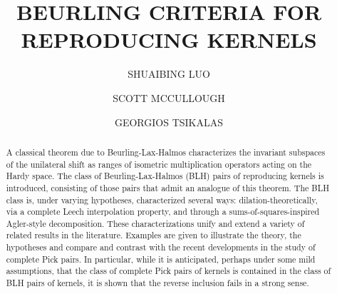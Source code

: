 \documentclass[a4paper,reqno,index]{amsart}
\numberwithin{equation}{section}
\theoremstyle{definition}
\begin{document}
\newcommand{\N}{\mathbb{N}}
\newcommand{\T}{\mathbb{T}}



\theoremstyle{definition}


\theoremstyle{remark}

\title[\small BEURLING CRITERIA FOR REPRODUCING KERNELS]{\large   BEURLING CRITERIA FOR REPRODUCING KERNELS}


\author[\small LUO]{SHUAIBING LUO}
\address{SCHOOL OF MATHEMATICS, HUNAN UNIVERSITY, CHANGSHA, HUNAN, 410082,
PR CHINA}


\author[\small MCCULLOUGH]{SCOTT MCCULLOUGH}
\address{DEPARTMENT OF MATHEMATICS, UNIVERSITY OF FLORIDA, GAINESVILLE, FL}
\author[\small TSIKALAS]{GEORGIOS TSIKALAS}
\address{DEPARTMENT OF MATHEMATICS, UC SANTA BARBARA, SANTA BARBARA, CA}






 

\small
\begin{abstract}
 A classical theorem due to Beurling-Lax-Halmos characterizes the invariant subspaces of the unilateral shift as ranges of isometric multiplication operators acting on the Hardy space.   The class of Beurling-Lax-Halmos (BLH) pairs of reproducing kernels is introduced, consisting of those pairs that admit an analogue of this theorem.   The BLH class is, under varying hypotheses, characterized several ways: dilation-theoretically, via a complete Leech interpolation property, and through a sums-of-squares-inspired Agler-style decomposition. These characterizations unify and extend a variety of related results in the literature. Examples are given to illustrate the theory, the hypotheses and compare and contrast with the recent developments in the study of complete Pick pairs. In particular,  while it is  anticipated, perhaps under some mild assumptions,
 that the class of  complete Pick pairs of kernels is contained in the class of BLH pairs of kernels, it is shown that the reverse inclusion fails in a strong sense.
\end{abstract}
\maketitle


 \par \normalsize
\end{document}

